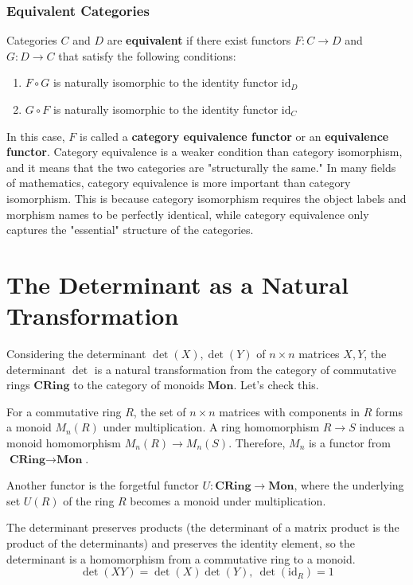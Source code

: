 \documentclass[uplatex,a4j,12pt,dvipdfmx]{jsarticle}
\begin{document}
\subsubsection{Equivalent Categories}
Categories $C$ and $D$ are \textbf{equivalent} if there exist functors $F: C \to D$ and $G: D \to C$ that satisfy the following conditions:
\begin{enumerate}
	\item $F \circ G$ is naturally isomorphic to the identity functor $\mathrm{id}_D$
	\item $G \circ F$ is naturally isomorphic to the identity functor $\mathrm{id}_C$
\end{enumerate}
In this case, $F$ is called a \textbf{category equivalence functor} or an \textbf{equivalence functor}.
Category equivalence is a weaker condition than category isomorphism, and it means that the two categories are "structurally the same." In many fields of mathematics, category equivalence is more important than category isomorphism. This is because category isomorphism requires the object labels and morphism names to be perfectly identical, while category equivalence only captures the "essential" structure of the categories.




\section{The Determinant as a Natural Transformation}

Considering the determinant $\det(X), \det(Y)$ of $n \times n$ matrices $X,Y$,
the determinant $\det$ is a natural transformation from the category of commutative rings $\textbf{CRing}$ to the category of monoids $\textbf{Mon}$.
Let's check this.

	{}

For a commutative ring $R$, the set of $n \times n$ matrices with components in $R$ forms a monoid $M_{n}(R)$ under multiplication.
A ring homomorphism $R \to S$ induces a monoid homomorphism $M_{n} (R) \to M_{n} (S)$.
Therefore, $M_{n}$ is a functor from $\textbf{CRing} \to \textbf{Mon}$.

Another functor is the forgetful functor $U : \textbf{CRing} \to \textbf{Mon}$, where the underlying set $U(R)$ of the ring $R$ becomes a monoid under multiplication.

The determinant preserves products (the determinant of a matrix product is the product of the determinants) and preserves the identity element, so the determinant is a homomorphism from a commutative ring to a monoid.
$$\det(XY) = \det(X)\det(Y), \ \det(\text{id}_{R}) = 1$$
\end{document}
